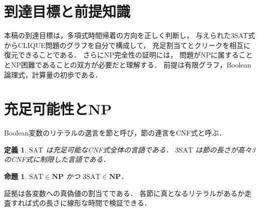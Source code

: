\documentclass[a5paper,10pt,onecolumn]{jsarticle}
\makeatletter
\theoremstyle{mathnotetheorem}
\newtheorem{definition}[theorem]{定義}
\newtheorem{proposition}[theorem]{命題}
\renewcommand{\proofname}{証明}
\renewenvironment{proof}[1][\proofname]{%
  \par\pushQED{\qed}\normalfont\topsep4\p@\@plus2\p@\relax
  \trivlist\item[\hskip\labelsep\bfseries #1]\ignorespaces
}{\popQED\endtrivlist\@endpefalse}
\makeatother
\begin{document}
\section*{到達目標と前提知識}
本稿の到達目標は，多項式時間帰着の方向を正しく判断し，
与えられた3SAT式からCLIQUE問題のグラフを自分で構成して，
充足割当てとクリークを相互に復元できることである．
さらにNP完全性の証明には，
問題がNPに属することとNP困難であることの双方が必要だと理解する．
前提は有限グラフ，Boolean論理式，計算量の初歩である．

\section{充足可能性とNP}
Boolean変数のリテラルの選言を節と呼び，節の連言をCNF式と呼ぶ．
\begin{definition}
$\mathrm{SAT}$ は充足可能なCNF式全体の言語である．
$\mathrm{3SAT}$ は節の長さが高々3のCNF式に制限した言語である．
\end{definition}
\begin{proposition}
$\mathrm{SAT}\in\mathbf{NP}$ かつ $\mathrm{3SAT}\in\mathbf{NP}$．
\end{proposition}
\begin{proof}
証拠は各変数への真偽値の割当てである．
各節に真となるリテラルがあるか走査すれば式の長さに線形な時間で検証できる．
\end{proof}
\end{document}
